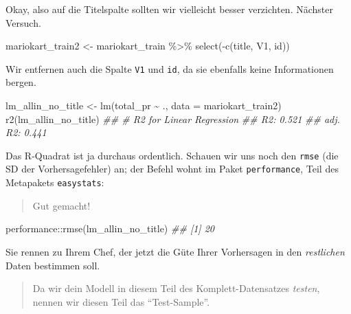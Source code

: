 \documentclass[
  letterpaper,
  oneside,
  open=any]{scrbook}
\newenvironment{Shaded}{\begin{snugshade}}{\end{snugshade}}
\newcommand{\AttributeTok}[1]{\textcolor[rgb]{0.40,0.45,0.13}{#1}}
\newcommand{\DocumentationTok}[1]{\textcolor[rgb]{0.37,0.37,0.37}{\textit{#1}}}
\newcommand{\FunctionTok}[1]{\textcolor[rgb]{0.28,0.35,0.67}{#1}}
\newcommand{\NormalTok}[1]{\textcolor[rgb]{0.00,0.23,0.31}{#1}}
\newcommand{\OtherTok}[1]{\textcolor[rgb]{0.00,0.23,0.31}{#1}}
\newcommand{\SpecialCharTok}[1]{\textcolor[rgb]{0.37,0.37,0.37}{#1}}
\theoremstyle{definition}
\theoremstyle{definition}
\theoremstyle{definition}
\theoremstyle{remark}
\begin{document}
Okay, also auf die Titelspalte sollten wir vielleicht besser verzichten.
Nächster Versuch.

\begin{Shaded}
\begin{Highlighting}[]
\NormalTok{mariokart\_train2 }\OtherTok{\textless{}{-}}
\NormalTok{  mariokart\_train }\SpecialCharTok{\%\textgreater{}\%} 
  \FunctionTok{select}\NormalTok{(}\SpecialCharTok{{-}}\FunctionTok{c}\NormalTok{(title, V1, id))}
\end{Highlighting}
\end{Shaded}

Wir entfernen auch die Spalte \texttt{V1} und \texttt{id}, da sie
ebenfalls keine Informationen bergen.

\begin{Shaded}
\begin{Highlighting}[]
\NormalTok{lm\_allin\_no\_title }\OtherTok{\textless{}{-}} \FunctionTok{lm}\NormalTok{(total\_pr }\SpecialCharTok{\textasciitilde{}}\NormalTok{ ., }\AttributeTok{data =}\NormalTok{ mariokart\_train2)}
\FunctionTok{r2}\NormalTok{(lm\_allin\_no\_title) }
\DocumentationTok{\#\# \# R2 for Linear Regression}
\DocumentationTok{\#\#        R2: 0.521}
\DocumentationTok{\#\#   adj. R2: 0.441}
\end{Highlighting}
\end{Shaded}

Das R-Quadrat ist ja durchaus ordentlich. Schauen wir uns noch den
\texttt{rmse} (die SD der Vorhersagefehler) an; der Befehl wohnt im
Paket \texttt{performance}, Teil des Metapakets \texttt{easystats}:

\begin{quote}
{} Gut gemacht!
\end{quote}

\begin{Shaded}
\begin{Highlighting}[]
\NormalTok{performance}\SpecialCharTok{::}\FunctionTok{rmse}\NormalTok{(lm\_allin\_no\_title)}
\DocumentationTok{\#\# [1] 20}
\end{Highlighting}
\end{Shaded}

Sie rennen zu Ihrem Chef, der jetzt die Güte Ihrer Vorhersagen in den
\emph{restlichen} Daten bestimmen soll.

\begin{quote}
{} Da wir dein Modell in diesem Teil des
Komplett-Datensatzes \emph{testen}, nennen wir diesen Teil das
\enquote{Test-Sample}.
\end{quote}
\end{document}
